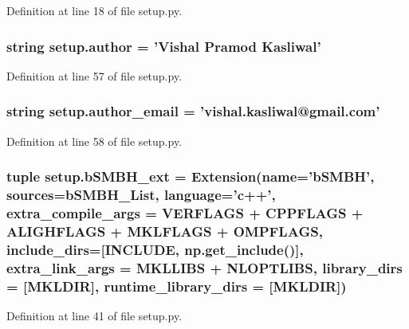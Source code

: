 Definition at line 18 of file setup.\-py.

\hypertarget{namespacesetup_ac83393287a89728d636e4ae9f4ac914f}{
\subsubsection[{author}]{\setlength{\rightskip}{0pt plus 5cm}string setup.\-author = 'Vishal Pramod Kasliwal'}}\label{namespacesetup_ac83393287a89728d636e4ae9f4ac914f}


Definition at line 57 of file setup.\-py.

\hypertarget{namespacesetup_aa144ac52ed417d5c65d7377e0e75673e}{
\subsubsection[{author\-\_\-email}]{\setlength{\rightskip}{0pt plus 5cm}string setup.\-author\-\_\-email = 'vishal.\-kasliwal@gmail.\-com'}}\label{namespacesetup_aa144ac52ed417d5c65d7377e0e75673e}


Definition at line 58 of file setup.\-py.

\hypertarget{namespacesetup_a91a3cd768577c74b324ef9e0fdc8ae24}{
\subsubsection[{b\-S\-M\-B\-H\-\_\-ext}]{\setlength{\rightskip}{0pt plus 5cm}tuple setup.\-b\-S\-M\-B\-H\-\_\-ext = Extension({\bf name}='b\-S\-M\-B\-H', sources={\bf b\-S\-M\-B\-H\-\_\-\-List}, language='{\bf c}++', extra\-\_\-compile\-\_\-args = {\bf V\-E\-R\-F\-L\-A\-G\-S} + {\bf C\-P\-P\-F\-L\-A\-G\-S} + {\bf A\-L\-I\-G\-H\-F\-L\-A\-G\-S} + {\bf M\-K\-L\-F\-L\-A\-G\-S} + {\bf O\-M\-P\-F\-L\-A\-G\-S}, include\-\_\-dirs=\mbox{[}{\bf I\-N\-C\-L\-U\-D\-E}, np.\-get\-\_\-include()\mbox{]}, extra\-\_\-link\-\_\-args = {\bf M\-K\-L\-L\-I\-B\-S} + {\bf N\-L\-O\-P\-T\-L\-I\-B\-S}, library\-\_\-dirs = \mbox{[}{\bf M\-K\-L\-D\-I\-R}\mbox{]}, runtime\-\_\-library\-\_\-dirs = \mbox{[}{\bf M\-K\-L\-D\-I\-R}\mbox{]})}}\label{namespacesetup_a91a3cd768577c74b324ef9e0fdc8ae24}


Definition at line 41 of file setup.\-py.

